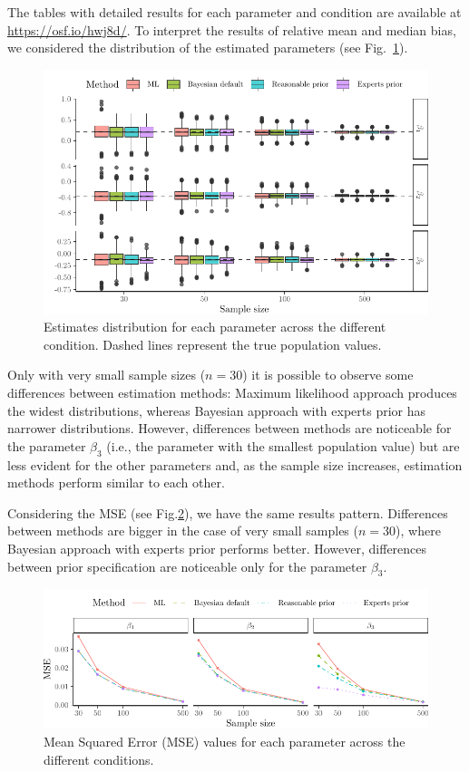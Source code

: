 \documentclass[graybox]{svmult}
\begin{document}
The tables with detailed results for each parameter and condition are available at \url{https://osf.io/hwj8d/}. To interpret the results of relative mean and median bias, we considered the distribution of the estimated parameters (see Fig.~\ref{fig:boxplots}).
\begin{figure}[t]
	\sidecaption
	\includegraphics[width = .75\textwidth]{figure/Plot_boxplots}
	\caption{Estimates distribution for each parameter across the different condition. Dashed lines represent the true population values.}
	\label{fig:boxplots}
\end{figure}
Only with very small sample sizes ($n=30$) it is possible to observe some differences between estimation methods: Maximum likelihood approach produces the widest distributions, whereas Bayesian approach with experts prior has narrower distributions. However, differences between methods are noticeable for the parameter $\beta_3$ (i.e., the parameter with the smallest population value) but are less evident for the other parameters and, as the sample size increases, estimation methods perform similar to each other.

Considering the MSE (see Fig.\ref{fig:mse}), we have the same results pattern. Differences between methods are bigger in the case of very small samples ($n=30$), where Bayesian approach with experts prior performs better. However, differences between prior specification are noticeable only for the parameter $\beta_3$.
\begin{figure}[b]
	\sidecaption
	\includegraphics[width = .75\textwidth]{figure/Plot_MSE}
	\caption{Mean Squared Error (MSE) values for each parameter across the different conditions.}
	\label{fig:mse}
\end{figure}
\end{document}
